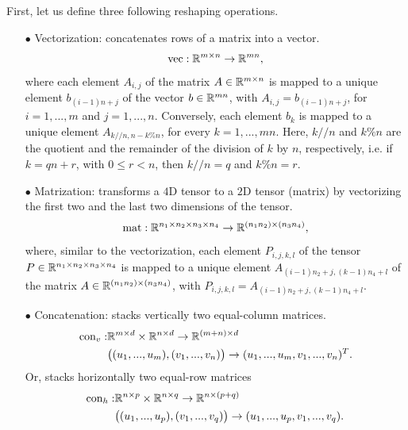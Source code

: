 First, let us define three following reshaping operations.
\begin{itemize}
  \item[$\bullet$] Vectorization: concatenates rows of a matrix into a vector.
  \begin{equation*}
    \text{vec}: \mathbb R^{m \times n} \to \mathbb R^{m n},
  \end{equation*}
  where each element $A_{i,j}$ of the matrix $A \in \mathbb R^{m \times n}$ is
  mapped to a unique element $b_{(i-1)n + j}$ of the vector
  $b \in \mathbb R^{m n}$, with $A_{i,j} = b_{(i-1)n + j}$, for $i = 1, ..., m$ and $j = 1, ...,n$.
  Conversely, each element $b_k$ is mapped to a unique element $A_{k // n, n - k \% n}$,
  for every $k = 1, ..., mn$. Here, $k // n$ and $k \% n$ are the quotient and
  the remainder of the division of $k$ by $n$,
  respectively, i.e. if $k = q n + r$, with $0 \leq r < n$, then $k // n = q$ and $k \% n = r$.

  \item[$\bullet$] Matrization: transforms a $4$D tensor to a $2$D tensor (matrix) by
  vectorizing the first two and the last two dimensions of the tensor.
  \begin{equation*}
    \text{mat}: \mathbb R^{n_1 \times n_2 \times n_3 \times n_4} \to \mathbb R^{(n_1 n_2) \times (n_3 n_4)},
  \end{equation*}
  where, similar to the vectorization, each element $P_{i,j,k,l}$ of the tensor
  $P \in \mathbb R^{n_1 \times n_2 \times n_3 \times n_4}$ is mapped to
  a unique element $A_{(i-1)n_2 + j, (k-1)n_4 + l}$ of the
  matrix $A \in \mathbb R^{(n_1 n_2) \times (n_3 n_4)}$,
  with $P_{i,j,k,l} = A_{(i-1)n_2 + j, (k-1)n_4 + l}$.

  \item[$\bullet$] Concatenation: stacks vertically two equal-column matrices.
  \begin{equation*}
    \begin{split}
      \text{con}_v: &\mathbb R^{m \times d} \times \mathbb R^{n \times d} \to \mathbb R^{(m+n) \times d} \\
      & \big( (u_1, ..., u_m),(v_1, ..., v_n) \big) \to (u_1, ..., u_m, v_1, ..., v_n)^T.
    \end{split}
  \end{equation*}
  Or, stacks horizontally two equal-row matrices
  \begin{equation*}
    \begin{split}
      \text{con}_h: &\mathbb R^{n \times p} \times \mathbb R^{n \times q} \to \mathbb R^{n \times (p+q)} \\
      & \big( (u_1, ..., u_p),(v_1, ..., v_q) \big) \to (u_1, ..., u_p, v_1, ..., v_q).
    \end{split}
  \end{equation*}
\end{itemize}
